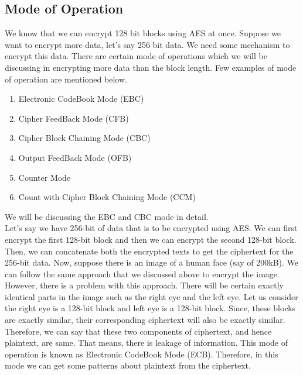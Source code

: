\documentclass[11pt]{article}
\begin{document}
\subsection{Mode of Operation}
We know that we can encrypt 128 bit blocks using AES at once. Suppose we want to encrypt more data, let's say 256 bit data. We need some mechanism to encrypt this data. There are certain mode of operations which we will be discussing in encrypting more data than the block length. Few examples of mode of operation are mentioned below.
\begin{enumerate}
    \item Electronic CodeBook Mode (EBC)
    \item Cipher FeedBack Mode (CFB)
    \item Cipher Block Chaining Mode (CBC)
    \item Output FeedBack Mode (OFB)
    \item Counter Mode
    \item Count with Cipher Block Chaining Mode (CCM)
\end{enumerate}
We will be discussing the EBC and CBC mode in detail.\\

Let's say we have 256-bit of data that is to be encrypted using AES. We can first encrypt the first 128-bit block and then we can encrypt the second 128-bit block. Then, we can concatenate both the encrypted texts to get the ciphertext for the 256-bit data. Now, suppose there is an image of a human face (say of 200kB). We can follow the same approach that we discussed above to encrypt the image. However, there is a problem with this approach. There will be certain exactly identical parts in the image such as the right eye and the left eye. Let us consider the right eye is a 128-bit block and left eye is a 128-bit block. Since, these blocks are exactly similar, their corresponding ciphertext will also be exactly similar. Therefore, we can say that these two components of ciphertext, and hence plaintext, are same. That means, there is leakage of information. This mode of operation is known as Electronic CodeBook Mode (ECB). Therefore, in this mode we can get some patterns about plaintext from the ciphertext.
\end{document}
